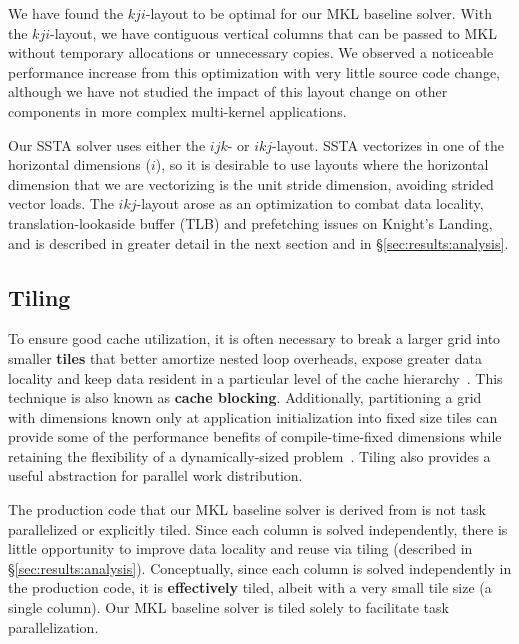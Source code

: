 \documentclass[10pt, conference, compsocconf]{IEEEtran}
\begin{document}
We have found the \(kji\)-layout to be optimal for our MKL baseline solver.
With the \(kji\)-layout, we have contiguous vertical columns that can be
  passed to MKL without temporary allocations or unnecessary copies.
We observed a noticeable performance increase from this optimization with very
  little source code change, although we have not studied the impact of this
  layout change on other components in more complex multi-kernel applications.

Our SSTA solver uses either the \(ijk\)- or \(ikj\)-layout.
SSTA vectorizes in one of the horizontal dimensions (\(i\)), so it is
  desirable to use layouts where the horizontal dimension that we are
  vectorizing is the unit stride dimension, avoiding strided vector loads.
The \(ikj\)-layout arose as an optimization to combat data locality,
  translation-lookaside buffer (TLB) and prefetching issues on Knight's
  Landing, and is described in greater detail in the next section and in
  \S\ref{sec:results:analysis}.

\subsection{Tiling}
\label{sec:impl:tiling}

To ensure good cache utilization, it is often necessary to break a larger
  grid into smaller \textbf{tiles} that better amortize nested loop overheads,
  expose greater data locality and keep data resident in a particular level of
  the cache hierarchy~\cite{cache_blocking}.
This technique is also known as \textbf{cache blocking}.
Additionally, partitioning a grid with dimensions known only at application
  initialization into fixed size tiles can provide some of the performance
  benefits of compile-time-fixed dimensions while retaining the flexibility of a
  dynamically-sized problem~\cite{kokkos}.
Tiling also provides a useful abstraction for parallel work distribution.

The production code that our MKL baseline solver is derived from is not task
  parallelized or explicitly tiled.
Since each column is solved independently, there is little opportunity to improve
  data locality and reuse via tiling (described in \S\ref{sec:results:analysis}).
Conceptually, since each column is solved independently in the production code,
  it is \textbf{effectively} tiled, albeit with a very small tile size (a single
  column).
Our MKL baseline solver is tiled solely to facilitate task parallelization.
\end{document}
